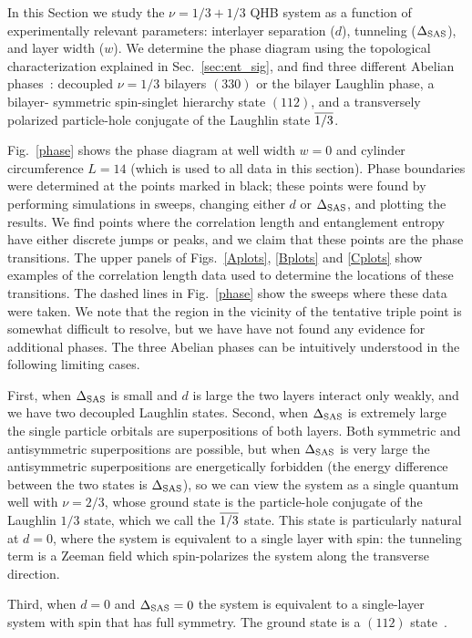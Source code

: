 	In this Section we study the $\nu=1/3+1/3$ QHB system as a function of experimentally relevant parameters: interlayer separation ($d$), tunneling ($\Delta_\textrm{SAS}$), and layer width ($w$). 
We determine the phase diagram using the topological characterization explained in Sec.~\ref{sec:ent_sig}, and find three different Abelian phases~\cite{HaldaneDiagram}:  decoupled $\nu = 1/3$ bilayers $(330)$ or the bilayer Laughlin phase, a bilayer- symmetric spin-singlet hierarchy state $(112)$, and a transversely polarized particle-hole conjugate of the Laughlin state $\overline{1/3}$. 

Fig.~\ref{phase} shows the phase diagram at well width $w=0$ and cylinder circumference $L = 14$ (which is used to all data in this section). 
Phase boundaries were determined at the points marked in black; these points were found by performing simulations in sweeps, changing either $d$ or $\Delta_\textrm{SAS}$, and plotting the results. 
We find points where the correlation length and entanglement entropy have either discrete jumps or peaks, and we claim that these points are the phase transitions.
The upper panels of Figs.~\ref{Aplots}, \ref{Bplots} and \ref{Cplots} show examples of the correlation length data used to determine the locations of these transitions. The dashed lines in Fig.~\ref{phase} show the sweeps where these data were taken. 
We note that the region in the vicinity of the tentative triple point is somewhat difficult to resolve, but we have have not found any evidence for additional phases.
The three Abelian phases can be intuitively understood in the following limiting cases.

First, when $\Delta_\textrm{SAS}$ is small and $d$ is large the two layers interact only weakly, and we have two decoupled Laughlin states.
Second, when $\Delta_\textrm{SAS}$ is extremely large the single particle orbitals are superpositions of both layers. 
Both symmetric and antisymmetric superpositions are possible, but when $\Delta_\textrm{SAS}$ is very large the antisymmetric superpositions are energetically forbidden (the energy difference between the two states is $\Delta_\textrm{SAS}$), so we can view the system as a single quantum well with $\nu=2/3$,  whose ground state is the particle-hole conjugate of the Laughlin $1/3$ state, which we call the $\overline{1/3}$ state. 
This state is particularly natural at $d=0$, where the system is equivalent to a single layer with spin: the tunneling term is a Zeeman field which spin-polarizes the system along the transverse direction.

Third, when $d=0$ and $\Delta_\textrm{SAS}=0$ the system is equivalent to a single-layer system with spin that has full  symmetry.
The ground state is a $(112)$ state~\cite{Wu93, HaldaneDiagram, Moore97}. 

